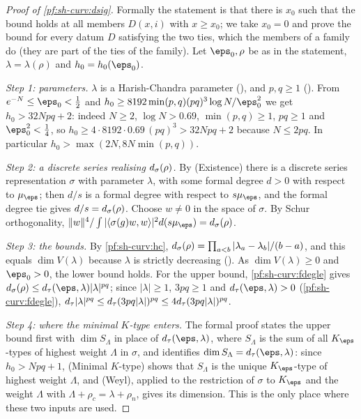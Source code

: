 \begin{proof}[Proof of \cref{pf:sh-curv:dsig}]
Formally the statement is that there is $x_0$ such that the bound holds at all members $D(x,i)$ with $x\ge x_0$; we take
$x_0=0$ and prove the bound for every datum $D$ satisfying the two ties, which the members of a family do (they are part
of the ties of the family). Let $\eps_0,\rho$ be as in the statement, $\lambda=\lambda(\rho)$ and $h_0=\shcurvGap(\eps_0)$.

\emph{Step 1: parameters.} $\lambda$ is a Harish-Chandra parameter (),
and $p,q\ge1$ (). From $e^{-N}\le\eps_0<\frac12$
and $h_0\ge8192\min(p,q)(pq)^3\log N/\eps_0^2$ we get $h_0>32Npq+2$: indeed $N\ge2$, $\log N>0.69$, $\min(p,q)\ge1$, $pq\ge1$
and $\eps_0^2<\frac14$, so $h_0\ge4\cdot8192\cdot0.69\,(pq)^3>32Npq+2$ because $N\le2pq$. In particular
$h_0>\max(2N,8N\min(p,q))$.

\emph{Step 2: a discrete series realising $d_\sigma(\rho)$.} By (Existence) there is a discrete series representation
$\sigma$ with parameter $\lambda$, with some formal degree $d>0$ with respect to $\mu_\eps$; then $d/s$ is a formal degree
with respect to $s\mu_\eps$, and the formal degree tie gives $d/s=d_\sigma(\rho)$. Choose $w\ne0$ in the space of $\sigma$. By Schur
orthogonality, $\|w\|^4/\int|\langle\sigma(g)w,w\rangle|^2d(s\mu_\eps)=\shcurvDs(\rho)$.

\emph{Step 3: the bounds.} By \cref{pf:sh-curv:hc}, $d_\sigma(\rho)=\prod_{a<b}|\lambda_a-\lambda_b|/(b-a)$, and this equals
$\dim V(\lambda)$ because $\lambda$ is strictly decreasing
(). As $\dim V(\lambda)\ge0$ and
$\eps_0>0$, the lower bound holds. For the upper bound, \cref{pf:sh-curv:fdegle} gives
$\shcurvDs(\rho)\le\shcurvDt(\eps,\lambda)|\lambda|^{pq}$; since $|\lambda|\ge1$, $3pq\ge1$ and $\shcurvDt(\eps,\lambda)>0$
(\cref{pf:sh-curv:fdegle}),
$d_\tau|\lambda|^{pq}\le d_\tau(3pq|\lambda|)^{pq}\le4d_\tau(3pq|\lambda|)^{pq}$.

\emph{Step 4: where the minimal $K$-type enters.} The formal proof
states the upper bound first with $\dim S_\Lambda$ in place of $\shcurvDt(\eps,\lambda)$, where $S_\Lambda$ is the sum of all
$K_\eps$-types of highest weight $\Lambda$ in $\sigma$, and identifies $\dim S_\Lambda=\shcurvDt(\eps,\lambda)$: since $h_0>Npq+1$, (Minimal $K$-type) shows
that $S_\Lambda$ is the unique $K_\eps$-type of highest weight $\Lambda$, and (Weyl), applied to the restriction of $\sigma$
to $K_\eps$ and the weight $\Lambda$ with $\Lambda+\rho_c=\lambda+\rho_n$, gives its dimension. This is the only place where
these two inputs are used.
\end{proof}

